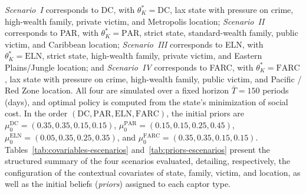\documentclass[review,authoryear,12pt]{elsarticle}
\theoremstyle{plain}
\theoremstyle{definition}
\newcommand{\1}{\mathbf{1}}
\begin{document}
\emph{Scenario~I} corresponds to DC, with $\theta_K^\ast=\mathrm{DC}$, lax state with pressure on crime, high-wealth family, private victim, and Metropolis location; \emph{Scenario~II} corresponds to PAR, with $\theta_K^\ast=\mathrm{PAR}$, strict state, standard-wealth family, public victim, and Caribbean location; \emph{Scenario~III} corresponds to ELN, with $\theta_K^\ast=\mathrm{ELN}$, strict state, high-wealth family, private victim, and Eastern Plains/Jungle location; and \emph{Scenario~IV} corresponds to FARC, with $\theta_K^\ast=\mathrm{FARC}$, lax state with pressure on crime, high-wealth family, public victim, and Pacific / Red Zone location. All four are simulated over a fixed horizon $\bar{T}=150$ periods (days), and optimal policy is computed from the state's minimization of social cost. In the order $(\mathrm{DC},\mathrm{PAR},\mathrm{ELN},\mathrm{FARC})$, the initial priors are $\mu_0^{\mathrm{DC}}=(0.35,0.35,0.15,0.15)$, $\mu_0^{\mathrm{PAR}}=(0.15,0.15,0.25,0.45)$, $\mu_0^{\mathrm{ELN}}=(0.05,0.35,0.25,0.35)$, and $\mu_0^{\mathrm{FARC}}=(0.35,0.35,0.15,0.15)$. Tables~\ref{tab:covariables-escenarios} and~\ref{tab:priors-escenarios} present the structured summary of the four scenarios evaluated, detailing, respectively, the configuration of the contextual covariates of state, family, victim, and location, as well as the initial beliefs (\emph{priors}) assigned to each captor type.
\end{document}
